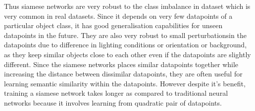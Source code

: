 Thus siamese networks are very robust to the class imbalance in dataset which is very common in real datasets. Since it depends on very few datapoints of a particular object class, it has good generalisation capabilities for unseen datapoints in the future. They are also very robust to small perturbationsin the datapoints due to difference in lighting conditions or orientation or background, as they keep similar objects close to each other even if the datapoints are slightly different. Since the siamese networks places similar datapoints together while increasing the distance between dissimilar datapoints, they are often useful for learning semantic similarity within the datapoints. However despite it's benefit, training a siamese network takes longer as compared to traditional neural networks because it involves learning from quadratic pair of datapoints.\cite*{siamese_network}
